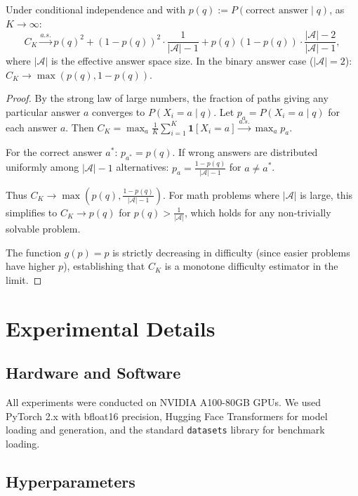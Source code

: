 \begin{proposition}
\label{prop:convergence_full}
Under conditional independence and with $p(q) := P(\text{correct answer} \mid q)$, as $K \to \infty$:
\[
C_K \xrightarrow{a.s.} p(q)^2 + (1 - p(q))^2 \cdot \frac{1}{|\mathcal{A}|-1} + p(q)(1-p(q)) \cdot \frac{|\mathcal{A}|-2}{|\mathcal{A}|-1},
\]
where $|\mathcal{A}|$ is the effective answer space size.
In the binary answer case ($|\mathcal{A}| = 2$): $C_K \to \max(p(q), 1-p(q))$.
\end{proposition}

\begin{proof}
By the strong law of large numbers, the fraction of paths giving any particular answer $a$ converges to $P(X_i = a \mid q)$.
Let $p_a = P(X_i = a \mid q)$ for each answer $a$.
Then $C_K = \max_a \frac{1}{K}\sum_{i=1}^K \mathbf{1}[X_i = a] \xrightarrow{a.s.} \max_a p_a$.

For the correct answer $a^*$: $p_{a^*} = p(q)$.
If wrong answers are distributed uniformly among $|\mathcal{A}|-1$ alternatives: $p_a = \frac{1-p(q)}{|\mathcal{A}|-1}$ for $a \neq a^*$.

Thus $C_K \to \max\left(p(q), \frac{1-p(q)}{|\mathcal{A}|-1}\right)$.
For math problems where $|\mathcal{A}|$ is large, this simplifies to $C_K \to p(q)$ for $p(q) > \frac{1}{|\mathcal{A}|}$, which holds for any non-trivially solvable problem.

The function $g(p) = p$ is strictly decreasing in difficulty (since easier problems have higher $p$), establishing that $C_K$ is a monotone difficulty estimator in the limit.
\end{proof}

\section{Experimental Details}
\label{app:experimental_details}

\subsection{Hardware and Software}
All experiments were conducted on NVIDIA A100-80GB GPUs.
We used PyTorch 2.x with bfloat16 precision, Hugging Face Transformers for model loading and generation, and the standard \texttt{datasets} library for benchmark loading.

\subsection{Hyperparameters}
\label{app:hyperparameters}

